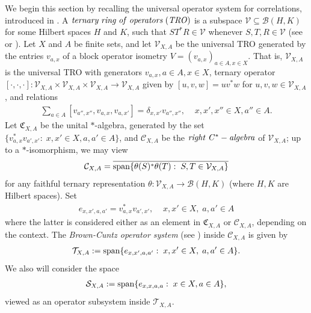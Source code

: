 \documentclass[11pt]{amsart}
\newcommand{\cl}[1]{\mathcal{#1}}
\begin{document}
We begin this section by recalling the universal operator system for correlations, introduced in \cite{tt}. A ${\it ternary \; ring \; of \; operators \; (TRO)}$ is a subspace $\cl{V} \subseteq \cl{B}(H, K)$ for some Hilbert spaces $H$ and $K$, such that $ST^{*}R \in \cl{V}$ whenever $S, T, R \in \cl{V}$ (see \cite[Section 4.3]{bm} or \cite{zettl}). Let $X$ and $A$ be finite sets, and let $\cl{V}_{X, A}$ be the universal TRO generated by the entries $v_{a, x}$ of a block operator isometry $V = (v_{a, x})_{a \in A, x \in X}$. That is, $\cl{V}_{X, A}$ is the universal TRO with generators $v_{a, x}, a \in A, x \in X$, ternary operator $[\cdot, \cdot, \cdot]: \cl{V}_{X, A}\times \cl{V}_{X, A}\times \cl{V}_{X, A}\rightarrow \cl{V}_{X, A}$ given by $[u, v, w] = uv^{*}w$ for $u, v, w \in \cl{V}_{X, A}$, and relations
\begin{gather*}
	\sum\limits_{a \in A}[v_{a'', x''}, v_{a, x}, v_{a, x'}] = \delta_{x, x'}v_{a'', x''}, \;\;\;\; x, x', x'' \in X, a'' \in A.
\end{gather*}
Let $\mathfrak{C}_{X, A}$ be the unital $*$-algebra, generated by the set $\{v_{a, x}^{*}v_{a', x'}: \; x, x' \in X, a, a' \in A\}$, and $\cl{C}_{X, A}$ be the ${\it right \; C^{*}-algebra}$ of $\cl{V}_{X, A}$; up to a $*$-isomorphism, we may view
\begin{gather*}
	\cl{C}_{X, A} = \overline{{\rm span}\{\theta(S)^{*}\theta(T): \; S, T \in \cl{V}_{X, A}\}}
\end{gather*}
\noindent for any faithful ternary representation $\theta: \cl{V}_{X, A}\rightarrow \cl{B}(H, K)$ (where $H, K$ are Hilbert spaces). Set
\begin{gather*}
	e_{x, x', a, a'} = v_{a, x}^{*}v_{a', x'}, \;\;\;\; x, x' \in X, \; a, a' \in A
\end{gather*}
\noindent where the latter is considered either as an element in $\mathfrak{C}_{X, A}$ or $\cl{C}_{X, A}$, depending on the context. The \textit{Brown-Cuntz operator system} (see \cite{tt}) inside $\cl{C}_{X, A}$ is given by
\begin{gather*}
	\cl{T}_{X, A} := {\rm span}\{e_{x, x', a, a'}: \; x, x' \in X, \; a, a' \in A\}.
\end{gather*}
\noindent We also will consider the space
\begin{gather*}
	\cl{S}_{X, A} := {\rm span}\{e_{x, x, a, a}: \; x \in X, a \in A\},
\end{gather*}
\noindent viewed as an operator subsystem inside $\cl{T}_{X, A}$.
\end{document}

